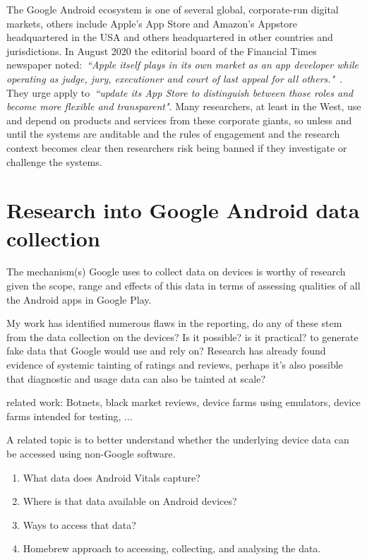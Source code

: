 The Google Android ecosystem is one of several global, corporate-run digital markets, others include Apple's App Store and Amazon's Appstore headquartered in the USA and others headquartered in other countries and jurisdictions. In August 2020 the editorial board of the Financial Times newspaper noted:~\emph{``Apple itself plays in its own market as an app developer while operating as judge, jury, executioner and court of last appeal for all others."}~\citep{ft2020_apple_risks_losing_an_epic_challenge}. They urge apply to~\emph{``update its App Store to distinguish between those roles and become more flexible and transparent"}. Many researchers, at least in the West, use and depend on products and services from these corporate giants, so unless and until the systems are auditable and the rules of engagement and the research context becomes clear then researchers risk being banned if they investigate or challenge the systems.

\section{Research into Google Android data collection}
The mechanism(s) Google uses to collect data on devices is worthy of research given the scope, range and effects of this data in terms of assessing qualities of all the Android apps in Google Play.

My work has identified numerous flaws in the reporting, do any of these stem from the data collection on the devices? Is it possible? is it practical? to generate fake data that Google would use and rely on? Research has already found evidence of systemic tainting of ratings and reviews, perhaps it's also possible that diagnostic and usage data can also be tainted at scale?

related work: Botnets, black market reviews, device farms using emulators, device farms intended for testing, ...

A related topic is to better understand whether the underlying device data can be accessed using non-Google software. 

\begin{enumerate}
    \item What data does Android Vitals capture?
    \item Where is that data available on Android devices?
    \item Ways to access that data?
    \item Homebrew approach to accessing, collecting, and analysing the data.
\end{enumerate}

